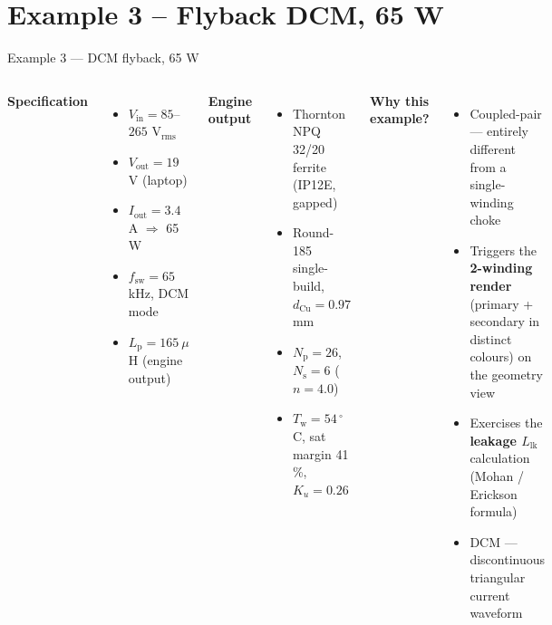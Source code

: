 \documentclass[11pt, aspectratio=169]{beamer}
\begin{document}
\section{Example 3 -- Flyback DCM, 65 W}

\begin{frame}{Example 3 --- DCM flyback, 65 W}
  \begin{columns}[T,onlytextwidth]
    \textbf{Specification}
    \begin{itemize}
      \item $V_\text{in} = 85$--$265$ V$_\text{rms}$
      \item $V_\text{out} = 19$ V (laptop)
      \item $I_\text{out} = 3.4$ A $\Rightarrow$ 65 W
      \item $f_\text{sw} = 65$ kHz, DCM mode
      \item $L_\text{p} = 165~\mu$H (engine output)
    \end{itemize}

    \textbf{Engine output}
    \begin{itemize}
      \item Thornton NPQ 32/20 ferrite (IP12E, gapped)
      \item Round-185 single-build, $d_\text{Cu} = 0.97$ mm
      \item $N_\text{p} = 26$, $N_\text{s} = 6$ ($n = 4.0$)
      \item $T_\text{w} = 54$\,$^\circ$C, sat margin 41\,\%,
            $K_u = 0.26$
    \end{itemize}

    \textbf{Why this example?}
    \begin{itemize}
      \item Coupled-pair --- entirely different from a
            single-winding choke
      \item Triggers the \textbf{2-winding render}
            (primary + secondary in distinct colours) on
            the geometry view
      \item Exercises the \textbf{leakage $L_\text{lk}$}
            calculation (Mohan / Erickson formula)
      \item DCM --- discontinuous triangular current
            waveform
    \end{itemize}
  \end{columns}
\end{frame}
\end{document}
